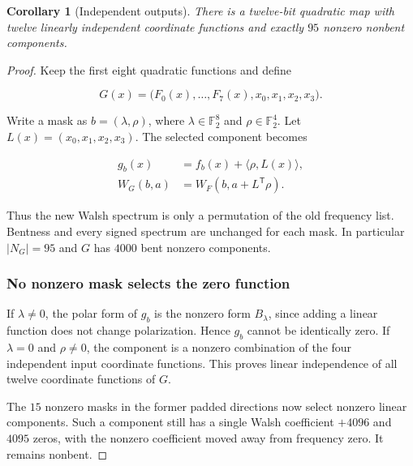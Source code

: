 \documentclass[11pt,a4paper]{article}
\newcommand{\F}{\mathbb F}
\newtheorem{corollary}[theorem]{Corollary}
\theoremstyle{definition}
\begin{document}
\begin{corollary}[Independent outputs]\label{cor:outputs}There is a twelve-bit quadratic map with twelve linearly independent coordinate functions and exactly $95$ nonzero nonbent components.\end{corollary}\begin{proof}

Keep the first eight quadratic functions and define


\begin{equation}\label{eq:89}
G(x)=\bigl(F_0(x),\ldots,F_7(x),x_0,x_1,x_2,x_3\bigr).
\end{equation}

Write a mask as $b=(\lambda ,\rho )$, where $\lambda \in \F_{2}^{8}$ and $\rho \in \F_{2}^{4}$. Let $L(x)=(x_{0},x_{1},x_{2},x_{3})$. The selected component becomes


\begin{equation}\label{eq:91}
\begin{aligned}g_b(x)&=f_b(x)+\langle\rho,L(x)\rangle,\\W_G(b,a)&=W_F(b,a+L^{\mathsf T}\rho).\end{aligned}
\end{equation}

Thus the new Walsh spectrum is only a permutation of the old frequency list. Bentness and every signed spectrum are unchanged for each mask. In particular $|N_{G}|=95$ and $G$ has $4000$ bent nonzero components.


\subsubsection*{No nonzero mask selects the zero function}

If $\lambda \ne 0$, the polar form of $g_{b}$ is the nonzero form $B_{\lambda }$, since adding a linear function does not change polarization. Hence $g_{b}$ cannot be identically zero. If $\lambda =0$ and $\rho \ne 0$, the component is a nonzero combination of the four independent input coordinate functions. This proves linear independence of all twelve coordinate functions of $G$.


The $15$ nonzero masks in the former padded directions now select nonzero linear components. Such a component still has a single Walsh coefficient $+4096$ and $4095$ zeros, with the nonzero coefficient moved away from frequency zero. It remains nonbent.


\end{proof}
\end{document}
